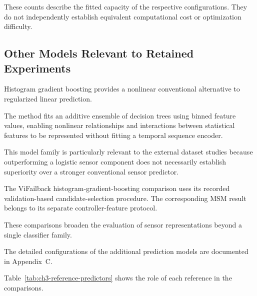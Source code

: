 These counts describe the fitted capacity of the respective configurations. They do not independently establish equivalent computational cost or optimization difficulty.

\subsection{Other Models Relevant to Retained Experiments}

Histogram gradient boosting provides a nonlinear conventional alternative to regularized linear prediction.

The method fits an additive ensemble of decision trees using binned feature values, enabling nonlinear relationships and interactions between statistical features to be represented without fitting a temporal sequence encoder.

This model family is particularly relevant to the external dataset studies because outperforming a logistic sensor component does not necessarily establish superiority over a stronger conventional sensor predictor.

The ViFailback histogram-gradient-boosting comparison uses its recorded validation-based candidate-selection procedure. The corresponding MSM result belongs to its separate controller-feature protocol.

These comparisons broaden the evaluation of sensor representations beyond a single classifier family.

The detailed configurations of the additional prediction models are documented in Appendix~C.

Table~\ref{tab:ch3-reference-predictors} shows the role of each reference in the comparisons.

